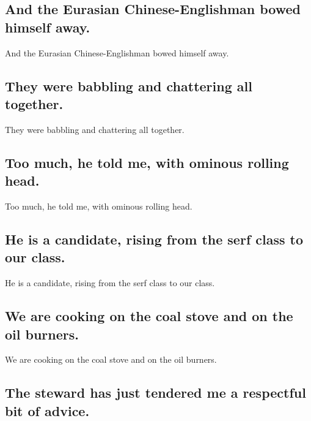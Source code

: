 \documentclass[]{article}
\begin{document}
\hypertarget{and-the-eurasian-chinese-englishman-bowed-himself-away.}{%
\subsection{And the Eurasian Chinese-Englishman bowed himself
away.}\label{and-the-eurasian-chinese-englishman-bowed-himself-away.}}

And the Eurasian Chinese-Englishman bowed himself away.

\hypertarget{they-were-babbling-and-chattering-all-together.}{%
\subsection{They were babbling and chattering all
together.}\label{they-were-babbling-and-chattering-all-together.}}

They were babbling and chattering all together.

\hypertarget{too-much-he-told-me-with-ominous-rolling-head.}{%
\subsection{Too much, he told me, with ominous rolling
head.}\label{too-much-he-told-me-with-ominous-rolling-head.}}

Too much, he told me, with ominous rolling head.

\hypertarget{he-is-a-candidate-rising-from-the-serf-class-to-our-class.}{%
\subsection{He is a candidate, rising from the serf class to our
class.}\label{he-is-a-candidate-rising-from-the-serf-class-to-our-class.}}

He is a candidate, rising from the serf class to our class.

\hypertarget{we-are-cooking-on-the-coal-stove-and-on-the-oil-burners.}{%
\subsection{We are cooking on the coal stove and on the oil
burners.}\label{we-are-cooking-on-the-coal-stove-and-on-the-oil-burners.}}

We are cooking on the coal stove and on the oil burners.

\hypertarget{the-steward-has-just-tendered-me-a-respectful-bit-of-advice.}{%
\subsection{The steward has just tendered me a respectful bit of
advice.}\label{the-steward-has-just-tendered-me-a-respectful-bit-of-advice.}}
\end{document}
